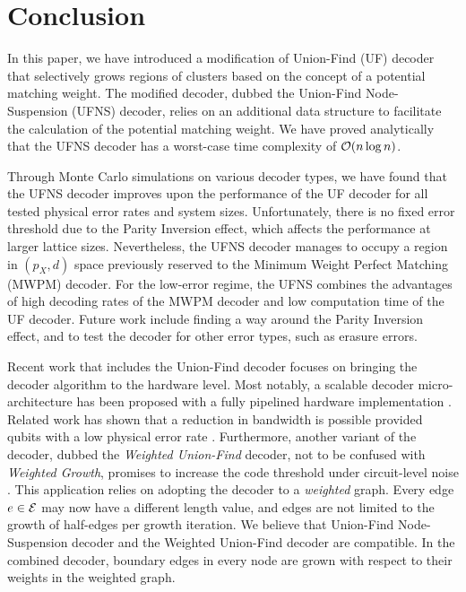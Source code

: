 \section{Conclusion}\label{sec:conclusion}

In this paper, we have introduced a modification of Union-Find (UF) decoder \cite{delfosse2017almost} that selectively grows regions of clusters based on the concept of a potential matching weight. The modified decoder, dubbed the Union-Find Node-Suspension (UFNS) decoder, relies on an additional data structure to facilitate the calculation of the potential matching weight. We have proved analytically that the UFNS decoder has a worst-case time complexity of $\mathcal{O}(n\log{n})$. 

Through Monte Carlo simulations on various decoder types, we have found that the UFNS decoder improves upon the performance of the UF decoder for all tested physical error rates and system sizes. Unfortunately, there is no fixed error threshold due to the Parity Inversion effect, which affects the performance at larger lattice sizes. Nevertheless, the UFNS decoder manages to occupy a region in $(p_X, d)$ space previously reserved to the Minimum Weight Perfect Matching (MWPM) decoder. For the low-error regime, the UFNS combines the advantages of high decoding rates of the MWPM decoder and low computation time of the UF decoder. Future work include finding a way around the Parity Inversion effect, and to test the decoder for other error types, such as erasure errors. 

Recent work that includes the Union-Find decoder focuses on bringing the decoder algorithm to the hardware level. Most notably, a scalable decoder micro-architecture has been proposed with a fully pipelined hardware implementation \cite{das2020scalable}. Related work has shown that a reduction in bandwidth is possible provided qubits with a low physical error rate \cite{delfosse2020hierarchical}. Furthermore, another variant of the decoder, dubbed the \emph{Weighted Union-Find} decoder, not to be confused with \emph{Weighted Growth}, promises to increase the code threshold under circuit-level noise \cite{huang2020fault}. This application relies on adopting the decoder to a \emph{weighted} graph. Every edge $e\in\mathcal{E}$ may now have a different length value, and edges are not limited to the growth of half-edges per growth iteration. We believe that Union-Find Node-Suspension decoder and the Weighted Union-Find decoder are compatible. In the combined decoder, boundary edges in every node are grown with respect to their weights in the weighted graph. 

